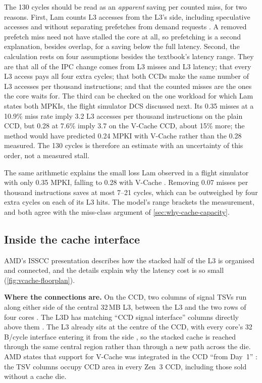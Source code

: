 The 130 cycles should be read as an \emph{apparent} saving per counted miss, for two reasons. First, Lam counts L3 accesses from the L3's side, including speculative accesses and without separating prefetches from demand requests \cite{lamAMDs7950X3DZen2023}. A removed prefetch miss need not have stalled the core at all, so prefetching is a second explanation, besides overlap, for a saving below the full latency. Second, the calculation rests on four assumptions besides the textbook's latency range. They are that all of the IPC change comes from L3 misses and L3 latency; that every L3 access pays all four extra cycles; that both CCDs make the same number of L3 accesses per thousand instructions; and that the counted misses are the ones the core waits for. The third can be checked on the one workload for which Lam states both MPKIs, the flight simulator DCS discussed next. Its 0.35 misses at a 10.9\% miss rate imply 3.2 L3 accesses per thousand instructions on the plain CCD, but 0.28 at 7.6\% imply 3.7 on the V-Cache CCD, about 15\% more; the method would have predicted 0.24 MPKI with V-Cache rather than the 0.28 measured. The 130 cycles is therefore an estimate with an uncertainty of this order, not a measured stall.

The same arithmetic explains the small loss Lam observed in a flight simulator with only 0.35 MPKI, falling to 0.28 with V-Cache \cite{lamAMDs7950X3DZen2023}. Removing 0.07 misses per thousand instructions saves at most 7--21 cycles, which can be outweighed by four extra cycles on each of its L3 hits. The model's range brackets the measurement, and both agree with the miss-class argument of \cref{sec:why-cache-capacity}.

\subsection{Inside the cache interface}
\label{sec:cache-interface}
AMD's ISSCC presentation describes how the stacked half of the L3 is organised and connected, and the details explain why the latency cost is so small (\cref{fig:vcache-floorplan}).

\textbf{Where the connections are.} On the CCD, two columns of signal TSVs run along either side of the central 32\,MB L3, between the L3 and the two rows of four cores \cite[slide~10]{wuu2022vcache}. The L3D has matching ``CCD signal interface'' columns directly above them \cite[slide~11]{wuu2022vcache}. The L3 already sits at the centre of the CCD, with every core's 32\,B/cycle interface entering it from the side \cite[slides~19, 21]{wuu2022vcache}, so the stacked cache is reached through the same central region rather than through a new path across the die. AMD states that support for V-Cache was integrated in the CCD ``from Day~1'' \cite[slide~10]{wuu2022vcache}: the TSV columns occupy CCD area in every Zen~3 CCD, including those sold without a cache die.

